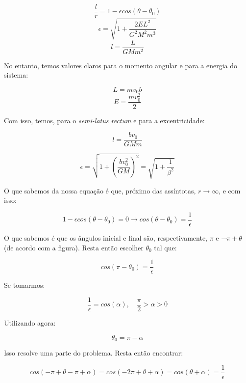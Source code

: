 \[
	\frac{l}{r} = 1 - \epsilon cos(\theta - \theta_0)
\]
\[
	\epsilon = \sqrt{1 + \frac{2EL^2}{G^2 M^2 m^3}}
\]
\[
	l = \frac{L}{GMm^2}
\]

No entanto, temos valores claros para o momento angular e para a energia do sistema:

\[
	L = mv_0b
\]
\[
	E = \frac{mv_0^2}{2}
\]

Com isso, temos, para o \textit{semi-latus rectum} e para a excentricidade:

\begin{equation}
	l = \frac{bv_0}{GMm}	\label{eq91}
\end{equation}

\begin{equation}
	\epsilon = \sqrt{1 + \left(\frac{bv_0^2}{GM}\right)^2} = \sqrt{1 + \frac{1}{\beta^2}}					\label{eq92}
\end{equation}

O que sabemos da nossa equação é que, próximo das assíntotas, $r \rightarrow \infty$, e com isso:

\begin{equation}
	1 - \epsilon cos(\theta - \theta_0) = 0 \rightarrow cos(\theta - \theta_0) = \frac{1}{\epsilon}			\label{eq93}
\end{equation}

O que sabemos é que os ângulos inicial e final são, respectivamente, $\pi$ e $-\pi + \theta$ (de acordo com a figura). Resta então escolher $\theta_0$ tal que:

\[
	cos(\pi - \theta_0) = \frac{1}{\epsilon}
\]

Se tomarmos:

\begin{equation}
	\frac{1}{\epsilon} = cos(\alpha), \quad \frac{\pi}{2} > \alpha > 0	\label{eq93}
\end{equation}

Utilizando agora:

\[
	\theta_0 = \pi - \alpha
\]

Isso resolve uma parte do problema. Resta então encontrar:

\[
	cos(-\pi + \theta - \pi + \alpha) = cos(-2\pi + \theta + \alpha) = cos(\theta + \alpha) = \frac{1}{\epsilon}
\]


